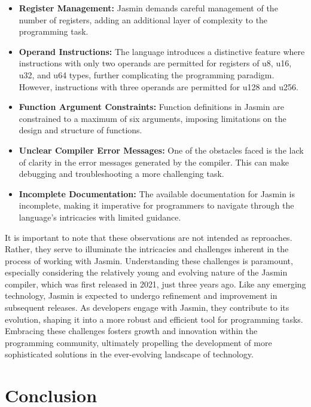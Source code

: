 \documentclass[runningheads]{llncs}
\begin{document}
\begin{itemize}
    \item \textbf{Register Management:} Jasmin demands careful management of the number of registers, adding an additional layer of complexity to the programming task.
    
    \item \textbf{Operand Instructions:} The language introduces a distinctive feature where instructions with only two operands are permitted for registers of u8, u16, u32, and u64 types, further complicating the programming paradigm. However, instructions with three operands are permitted for u128 and u256.

    \item \textbf{Function Argument Constraints:} Function definitions in Jasmin are constrained to a maximum of six arguments, imposing limitations on the design and structure of functions.

    \item \textbf{Unclear Compiler Error Messages:} One of the obstacles faced is the lack of clarity in the error messages generated by the compiler. This can make debugging and troubleshooting a more challenging task.

    \item \textbf{Incomplete Documentation:} The available documentation for Jasmin is incomplete, making it imperative for programmers to navigate through the language's intricacies with limited guidance.
\end{itemize}

It is important to note that these observations are not intended as reproaches. Rather, they serve to illuminate the intricacies and challenges inherent in the process of working with Jasmin. Understanding these challenges is paramount, especially considering the relatively young and evolving nature of the Jasmin compiler, which was first released in 2021, just three years ago. Like any emerging technology, Jasmin is expected to undergo refinement and improvement in subsequent releases. As developers engage with Jasmin, they contribute to its evolution, shaping it into a more robust and efficient tool for programming tasks. Embracing these challenges fosters growth and innovation within the programming community, ultimately propelling the development of more sophisticated solutions in the ever-evolving landscape of technology.



\section{Conclusion}
\end{document}
